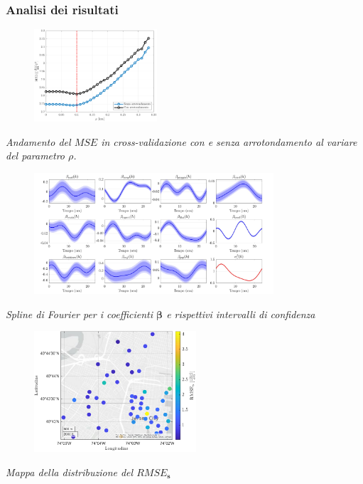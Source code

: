 \begin{frame}
	\frametitle{Analisi dei risultati}
	\centering
	\begin{figure}
		\includegraphics[height=130px]{../Tesi/Immagini/4. Caso di studio/Cross_validazione/MSE_rho_full_focus}
	\end{figure}
	\textit{Andamento del $MSE$ in cross-validazione con e senza arrotondamento al variare del parametro $\rho$.}
\end{frame}

\begin{frame}
	\centering
	\begin{figure}
		\includegraphics[height=170px]{../Tesi/Immagini/4. Caso di studio/Model selection/Trend spline, rho=100m}
	\end{figure}
	\textit{Spline di Fourier per i coefficienti $\boldsymbol{\beta}$ e rispettivi intervalli di confidenza}
\end{frame}

\begin{frame}
	\centering
	\begin{figure}
		\includegraphics[height=170px]{../Tesi/Immagini/4. Caso di studio/LOOCV/RMSE_s}
	\end{figure}
	\textit{Mappa della distribuzione del $RMSE_\mathbf{s}$}
\end{frame}


